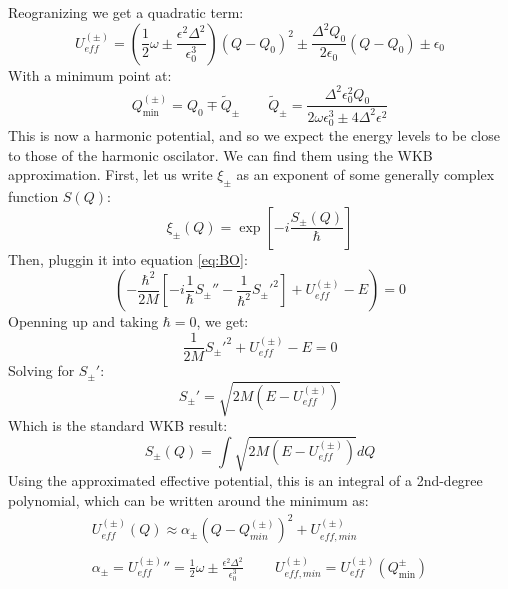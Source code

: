 \documentclass{article}
\begin{document}
Reogranizing we get a quadratic term:
\begin{equation}
    U_{eff}^{(\pm)} = \left(\frac{1}{2}\omega
    \pm \frac{\epsilon^2\Delta^2}{\epsilon_0^3}\right)(Q - Q_0)^2
    \pm \frac{\Delta^2 Q_0}{2\epsilon_0}(Q - Q_0)
    \pm \epsilon_0
\end{equation}
With a minimum point at:
\begin{equation}
    Q_{\min}^{(\pm)} = Q_0 \mp \tilde{Q}_{\pm}
    \qquad
    \tilde{Q}_{\pm} = \frac{\Delta^2\epsilon_0^2 Q_0}{2\omega\epsilon_0^3
    \pm 4\Delta^2\epsilon^2}
\end{equation}
 This is now a harmonic potential, and so we expect the energy levels to be close to those of the harmonic oscilator. We can find them using the WKB approximation. First, let us write $\xi_{\pm}$ as an exponent of some generally complex function $S(Q)$:
\begin{equation}
    \xi_{\pm}(Q) = \exp[-i\frac{S_{\pm}(Q)}{\hbar}]
\end{equation}
Then, pluggin it into equation \ref{eq:BO}:
\begin{equation}
    \left(-\frac{\hbar^2}{2M}\left[-i\frac{1}{\hbar}S_{\pm}'' - \frac{1}{\hbar^2}S_{\pm}'^2\right] + U_{eff}^{(\pm)} - E\right) = 0
\end{equation}
Openning up and taking $\hbar = 0$, we get:
\begin{equation}
    \frac{1}{2M}S_{\pm}'^2 + U_{eff}^{(\pm)} - E = 0
\end{equation}
Solving for $S_{\pm}'$:
\begin{equation}
    S_{\pm}' = \sqrt{2M\left(E - U_{eff}^{(\pm)}\right)}
\end{equation}
Which is the standard WKB result:
\begin{equation}
    S_{\pm}(Q) = \int \sqrt{2M\left(E - U_{eff}^{(\pm)}\right)} dQ
\end{equation}
Using the approximated effective potential, this is an integral of a 2nd-degree polynomial, which can be written around the minimum as:
\begin{equation}
\begin{gathered}
    U_{eff}^{(\pm)}(Q) \approx \alpha_{\pm}(Q - Q_{min}^{(\pm)})^2 + U_{eff, min}^{(\pm)}
    \\ \\
    \alpha_{\pm} = {U_{eff}^{(\pm)}}'' = \frac{1}{2}\omega
    \pm \frac{\epsilon^2\Delta^2}{\epsilon_0^3}\
    \qquad
    U_{eff,min}^{(\pm)} = U_{eff}^{(\pm)}(Q_{\min}^{\pm})
\end{gathered}
\end{equation}
\end{document}

